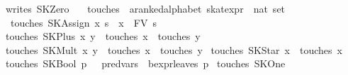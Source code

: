 \begin{isabellebody}
{}\ {}writes\ SKZero\ {}\ {}{}{}\isanewline
\isanewline
{}\isamarkupfalse%
\ touches\ {}{}\ {}{}a{}{}ranked{}alphabet\ skat{}expr\ {}\ nat\ set{}\ \isanewline
\ \ {}touches\ {}SKAssign\ x\ s{}\ {}\ {}x{}\ {}\ FV\ s{}\isanewline
{}\ {}touches\ {}SKPlus\ x\ y{}\ {}\ touches\ x\ {}\ touches\ y{}\isanewline
{}\ {}touches\ {}SKMult\ x\ y{}\ {}\ touches\ x\ {}\ touches\ y{}\isanewline
{}\ {}touches\ {}SKStar\ x{}\ {}\ touches\ x{}\isanewline
{}\ {}touches\ {}SKBool\ p{}\ {}\ {}\ {}pred{}vars\ {}\ bexpr{}leaves\ p{}{}\isanewline
{}\ {}touches\ SKOne\ {}\ {}{}{}\isanewline

\end{isabellebody}

